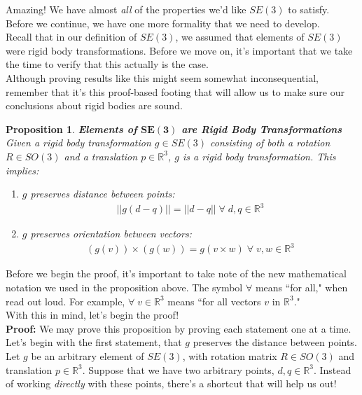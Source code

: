 \documentclass[oneside]{book}
\newtheorem{proposition}{Proposition}
\newenvironment{prop} %
  {\colorlet{shadecolor}{blue!9}\begin{shaded}\begin{proposition}}
  {\end{proposition}\end{shaded}}
\begin{document}
Amazing! We have almost \textit{all} of the properties we'd like $SE(3)$ to satisfy. Before we continue, we have one more formality that we need to develop.\\
Recall that in our definition of $SE(3)$, we assumed that elements of $SE(3)$ were rigid body transformations. Before we move on, it's important that we take the time to verify that this actually is the case.\\
Although proving results like this might seem somewhat inconsequential, remember that it's this proof-based footing that will allow us to make sure our conclusions about rigid bodies are sound.
\begin{prop}
\textbf{Elements of $\mathbf{SE(3)}$ are Rigid Body Transformations}\\
Given a rigid body transformation $g \in SE(3)$ consisting of both a rotation $R \in SO(3)$ and a translation $p \in \mathbb{R}^3$, $g$ is a rigid body transformation. This implies:
\begin{enumerate}
    \item $g$ preserves distance between points:
    \begin{align}
        ||g(d-q)|| = ||d-q|| \; \forall \; d, q\in \mathbb{R}^3
    \end{align}
    \item $g$ preserves orientation between vectors:
    \begin{align}
        (g(v))\times(g(w)) = g(v\times w) \; \forall \; v, w \in \mathbb{R}^3
    \end{align}
\end{enumerate}
\end{prop}
\noindent
Before we begin the proof, it's important to take note of the new mathematical notation we used in the proposition above. The symbol $\forall$ means ``for all," when read out loud. For example, $\forall \; v \in \mathbb{R}^3$ means ``for all vectors $v$ in $\mathbb{R}^3$."\\
With this in mind, let's begin the proof!\\
\textbf{Proof:} We may prove this proposition by proving each statement one at a time. Let's begin with the first statement, that $g$ preserves the distance between points.\\
Let $g$ be an arbitrary element of $SE(3)$, with rotation matrix $R \in SO(3)$ and translation $p \in \mathbb{R}^3$. Suppose that we have two arbitrary points, $d, q\in \mathbb{R}^3$. Instead of working \textit{directly} with these points, there's a shortcut that will help us out!\\
\end{document}
